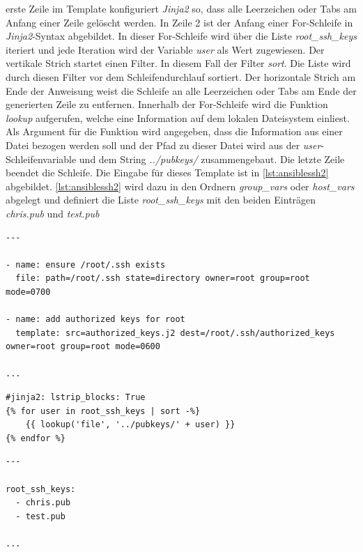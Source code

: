 \documentclass[titlepage]{report}
\begin{document}
erste Zeile im Template konfiguriert \emph{Jinja2} so, dass alle
Leerzeichen oder Tabs am Anfang einer Zeile gelöscht werden. In Zeile 2
ist der Anfang einer For\hyp{}Schleife in \emph{Jinja2}\hyp{}Syntax
abgebildet. In dieser For\hyp{}Schleife wird über die Liste
\emph{root\_ssh\_keys} iteriert und jede Iteration wird der Variable
\emph{user} als Wert zugewiesen. Der vertikale Strich startet einen
Filter. In diesem Fall der Filter \emph{sort}. Die Liste wird durch
diesen Filter vor dem Schleifendurchlauf sortiert. Der horizontale
Strich am Ende der Anweisung weist die Schleife an alle Leerzeichen oder
Tabs am Ende der generierten Zeile zu entfernen. Innerhalb der
For\hyp{}Schleife wird die Funktion \emph{lookup} aufgerufen, welche
eine Information auf dem lokalen Dateisystem einliest. Als Argument für
die Funktion wird angegeben, dass die Information aus einer Datei
bezogen werden soll und der Pfad zu dieser Datei wird aus der
\emph{user}\hyp{}Schleifenvariable und dem String \emph{../pubkeys/}
zusammengebaut. Die letzte Zeile beendet die Schleife. Die Eingabe für
dieses Template ist in \autoref{lst:ansiblessh2} abgebildet. 
\autoref{lst:ansiblessh2} wird dazu in den Ordnern \emph{group\_vars}
oder \emph{host\_vars} abgelegt und definiert die Liste
\emph{root\_ssh\_keys} mit den beiden Einträgen \emph{chris.pub} und
\emph{test.pub}
\begin{minipage}{\linewidth}
\begin{lstlisting}[caption={Beispiel eines Ansible Tasks},label={lst:ansiblessh}]
---

- name: ensure /root/.ssh exists
  file: path=/root/.ssh state=directory owner=root group=root mode=0700

- name: add authorized keys for root
  template: src=authorized_keys.j2 dest=/root/.ssh/authorized_keys owner=root group=root mode=0600

...
\end{lstlisting}
\end{minipage}
\begin{minipage}{\linewidth}
\begin{lstlisting}[caption={Beispiel eines Jinja2-Templates},label={lst:ansiblejinja2}]
#jinja2: lstrip_blocks: True
{% for user in root_ssh_keys | sort -%}
	{{ lookup('file', '../pubkeys/' + user) }}
{% endfor %}
\end{lstlisting}
\end{minipage}
\begin{minipage}{\linewidth}
\begin{lstlisting}[caption={Daten für das Jinja2-Template Beispiel},label={lst:ansiblessh2}]
---

root_ssh_keys:
  - chris.pub
  - test.pub

...
\end{lstlisting}
\end{minipage}
\end{document}
